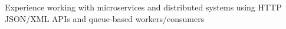 \item Experience working with microservices and distributed systems using HTTP JSON/XML APIs and queue-based workers/consumers